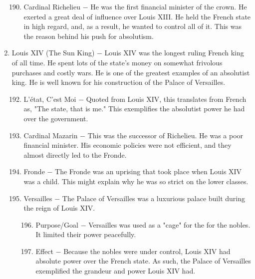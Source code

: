 \documentclass[12pt]{article}
\begin{document}
\begin{enumerate}
\begin{enumerate}[label=\arabic{*}.]
\setcounter{enumii}{189}

\item Cardinal Richelieu $-$ He was the first financial minister of the crown. He exerted a great deal of influence over Louis XIII. He held the French state in high regard, and, as a result, he wanted to control all of it. This was the reason behind his push for absolutism.

\end{enumerate}
\setcounter{enumi}{190}

\item Louis XIV (The Sun King) $-$ Louis XIV was the longest ruling French king of all time. He spent lots of the state's money on somewhat frivolous purchases and costly wars. He is one of the greatest examples of an absolutist king. He is well known for his construction of the Palace of Versailles.

\begin{enumerate}[label=\arabic{*}.]
\setcounter{enumii}{191}
\item L'\'etat, C'est Moi $-$ Quoted from Louis XIV, this translates from French as, "The state, that is me." This exemplifies the absolutist power he had over the government.

\item Cardinal Mazarin $-$ This was the successor of Richelieu. He was a poor financial minister. His economic policies were not efficient, and they almost directly led to the Fronde.

\item Fronde $-$ The Fronde was an uprising that took place when Louis XIV was a child. This might explain why he was so strict on the lower classes.

\item Versailles $-$ The Palace of Versailles was a luxurious palace built during the reign of Louis XIV.

\begin{enumerate}[label=\arabic{*}.]
\setcounter{enumiii}{195}

\item Purpose/Goal $-$ Versailles was used as a "cage" for the for the nobles. It limited their power peacefully.

\item Effect $-$ Because the nobles were under control, Louis XIV had absolute power over the French state. As such, the Palace of Versailles exemplified the grandeur and power Louis XIV had.


\end{enumerate}
\end{enumerate}
\end{enumerate}
\end{document}

